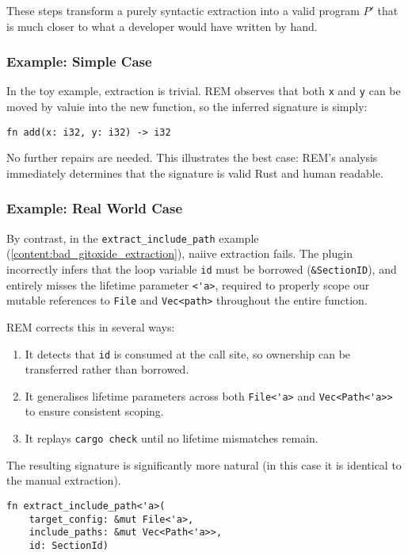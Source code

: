 These steps transform a purely syntactic extraction into a valid program $P'$
that is much closer to what a developer would have written by hand.

\subsubsection*{Example: Simple Case}

In the toy example, extraction is trivial. REM observes that both \verb|x| and
\verb|y| can be moved by valuie into the new function, so the inferred signature
is simply:

\begin{verbatim}
fn add(x: i32, y: i32) -> i32
\end{verbatim}

No further repairs are needed. This illustrates the best case: REM's analysis
immediately determines that the signature is valid Rust and human readable.

\subsubsection*{Example: Real World Case}

By contrast, in the \verb|extract_include_path| example
(\ref{content:bad_gitoxide_extraction}), naiive extraction fails. The plugin
incorrectly infers that the loop variable \verb|id| must be borrowed
(\verb|&SectionID|), and entirely misses the lifetime parameter \verb|<'a>|,
required to properly scope our mutable references to \verb|File| and
\verb|Vec<path>| throughout the entire function.

REM corrects this in several ways:
\begin{enumerate}
    \item It detects that \verb|id| is consumed at the call site, so ownership
    can be transferred rather than borrowed.
    \item It generalises lifetime parameters across both \verb|File<'a>| and
    \verb|Vec<Path<'a>>| to ensure consistent scoping.
    \item It replays \verb|cargo check| until no lifetime mismatches remain.
\end{enumerate}

The resulting signature is significantly more natural (in this case it is
identical to the manual extraction).

\begin{verbatim}
fn extract_include_path<'a>(
    target_config: &mut File<'a>,
    include_paths: &mut Vec<Path<'a>>,
    id: SectionId)
\end{verbatim}

